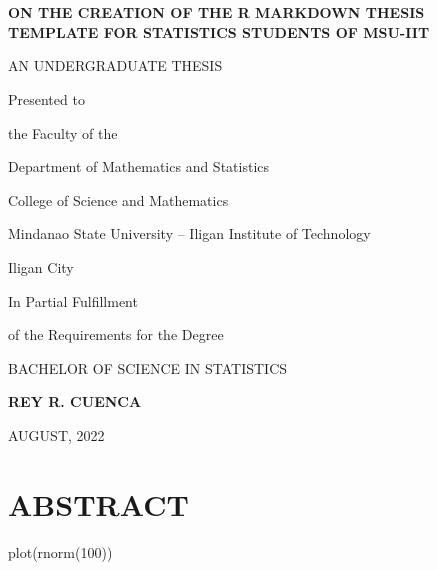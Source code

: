 \documentclass{source/tex/templates/maththesis}
\newenvironment{Shaded}{\begin{snugshade}}{\end{snugshade}}
\newcommand{\DecValTok}[1]{\textcolor[rgb]{0.00,0.00,0.81}{#1}}
\newcommand{\FunctionTok}[1]{\textcolor[rgb]{0.00,0.00,0.00}{#1}}
\newcommand{\NormalTok}[1]{#1}
\begin{document}
\setcounter{page}{1}


\chapter*{}

\phantom{xs}
\vspace{5pt}
\thispagestyle{empty}
\begin{center}
\large\textbf{ON THE CREATION OF THE R MARKDOWN THESIS TEMPLATE FOR STATISTICS STUDENTS OF MSU-IIT} 
\end{center}

\vfill

\begin{center}
AN UNDERGRADUATE THESIS
\end{center}

\begin{center}
Presented to 

the Faculty of the 

Department of Mathematics and Statistics

College of Science and Mathematics

Mindanao State University -- Iligan Institute of Technology

Iligan City
\end{center}

\vfill

\begin{center}
In Partial Fulfillment

of the Requirements for the Degree

BACHELOR OF SCIENCE IN STATISTICS
\end{center}

\vfill

\begin{center}
\textbf{REY R. CUENCA}

AUGUST, 2022
\end{center}

\vspace{-1in}

\hypertarget{abstract-1}{%
\chapter*{ABSTRACT}\label{abstract-1}}

\begin{Shaded}
\begin{Highlighting}[]
\FunctionTok{plot}\NormalTok{(}\FunctionTok{rnorm}\NormalTok{(}\DecValTok{100}\NormalTok{))}
\end{Highlighting}
\end{Shaded}
\end{document}
